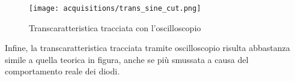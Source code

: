 \begin{figure}[H]
    \centering
    \texttt{[image: acquisitions/trans\_sine\_cut.png]}
    \caption{Transcaratteristica tracciata con l'oscilloscopio}
    \label{acq_sine_oscilloscope}
\end{figure}

Infine, la transcaratteristica tracciata tramite oscilloscopio risulta abbastanza simile a
quella teorica in figura, anche se più smussata a causa del comportamento reale dei diodi.

